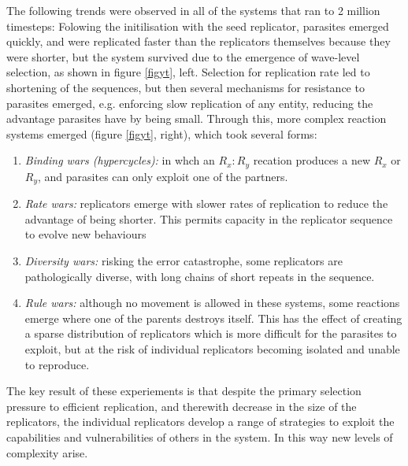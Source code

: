 \documentclass[twocolumn]{article}
\providecommand{\tightlist}{%
  \setlength{\itemsep}{0pt}\setlength{\parskip}{0pt}}
\begin{document}
The following trends were observed in all of the systems that ran to 2 million timesteps:
Folowing the initilisation with the seed replicator, parasites emerged quickly, and were 
replicated faster than the replicators themselves because they were shorter, but the system survived 
due to the emergence of wave-level selection, as shown in figure \ref{figyt}, left.
Selection for replication rate led to shortening of the sequences, but then several mechanisms for 
resistance to parasites emerged, e.g. enforcing slow replication of any
entity, reducing the advantage parasites have by being small. 
Through this, more complex reaction systems emerged (figure \ref{figyt}, right), 
which took several forms:

\begin{enumerate}
\def\labelenumi{\arabic{enumi}.}
\tightlist
\item
  \emph{Binding wars (hypercycles):} in whch an $R_x:R_y$ recation
  produces a new $R_x$ or $R_y$, and parasites can only exploit one of the
  partners.
\item
  \emph{Rate wars:} replicators emerge with slower rates of replication
  to reduce the advantage of being shorter. This permits capacity in the
  replicator sequence to evolve new behaviours
\item
  \emph{Diversity wars:} risking the error catastrophe, some replicators
  are pathologically diverse, with long chains of short repeats in the sequence.
\item
  \emph{Rule wars:} although no movement is allowed in these
  systems, some reactions emerge where one of the parents destroys
  itself. This has the effect of creating a sparse distribution of
  replicators which is more difficult for the parasites to exploit, but at the
  risk of individual replicators becoming isolated and unable to
  reproduce.
\end{enumerate}

The key result of these experiements is that despite  the primary selection pressure
to efficient replication, and therewith decrease in the size of the replicators,
 the individual replicators   develop a
range of strategies to exploit the capabilities and vulnerabilities
of others in the system. In this way new levels of complexity arise.
\end{document}
